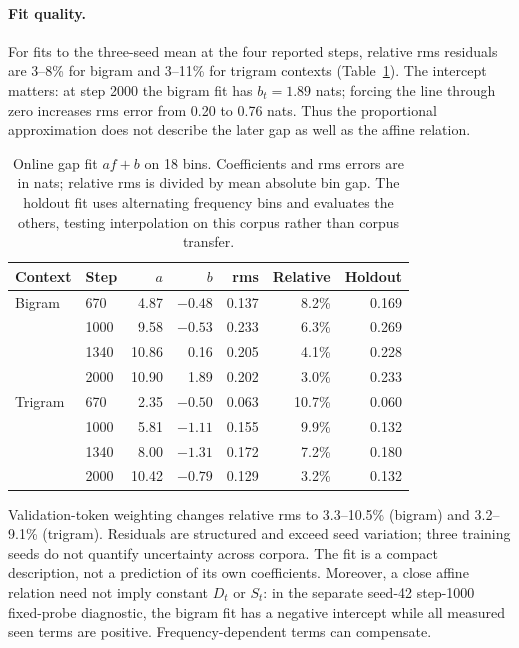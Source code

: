 \paragraph{Fit quality.}
For fits to the three-seed mean at the four reported steps, relative rms residuals are 3--8\% for bigram and 3--11\% for trigram contexts (Table~\ref{tab:affine}). The intercept matters: at step 2000 the bigram fit has $b_t=1.89$ nats; forcing the line through zero increases rms error from 0.20 to 0.76 nats. Thus the proportional approximation does not describe the later gap as well as the affine relation.

\begin{table}[!htbp]
\centering\small
\caption{Online gap fit $af+b$ on 18 bins. Coefficients and rms errors are in nats; relative rms is divided by mean absolute bin gap. The holdout fit uses alternating frequency bins and evaluates the others, testing interpolation on this corpus rather than corpus transfer.}
\label{tab:affine}
\begin{tabular}{llrrrrr}
\toprule
Context & Step & $a$ & $b$ & rms & Relative & Holdout\\
\midrule
Bigram & 670 & 4.87 & $-0.48$ & 0.137 & 8.2\% & 0.169\\
 & 1000 & 9.58 & $-0.53$ & 0.233 & 6.3\% & 0.269\\
 & 1340 & 10.86 & 0.16 & 0.205 & 4.1\% & 0.228\\
 & 2000 & 10.90 & 1.89 & 0.202 & 3.0\% & 0.233\\
Trigram & 670 & 2.35 & $-0.50$ & 0.063 & 10.7\% & 0.060\\
 & 1000 & 5.81 & $-1.11$ & 0.155 & 9.9\% & 0.132\\
 & 1340 & 8.00 & $-1.31$ & 0.172 & 7.2\% & 0.180\\
 & 2000 & 10.42 & $-0.79$ & 0.129 & 3.2\% & 0.132\\
\bottomrule
\end{tabular}
\end{table}

Validation-token weighting changes relative rms to 3.3--10.5\% (bigram) and 3.2--9.1\% (trigram). Residuals are structured and exceed seed variation; three training seeds do not quantify uncertainty across corpora. The fit is a compact description, not a prediction of its own coefficients. Moreover, a close affine relation need not imply constant $D_t$ or $S_t$: in the separate seed-42 step-1000 fixed-probe diagnostic, the bigram fit has a negative intercept while all measured seen terms are positive. Frequency-dependent terms can compensate.

